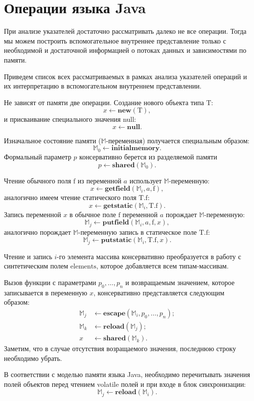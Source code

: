 \documentclass[14pt,titlepage,draft]{extarticle}
\newcommand{\M}{\ensuremath{\mathbb{M}}}
\newcommand{\Mhyp}{$\mathbb{M}$\hyp}
\newcommand{\NEW}{\textbf{new}}
\newcommand{\NULL}{\textbf{null}}
\newcommand{\INITIALMEMORY}{\textbf{initialmemory}}
\newcommand{\GETFIELD}{\textbf{getfield}}
\newcommand{\PUTFIELD}{\textbf{putfield}}
\newcommand{\GETSTATIC}{\textbf{getstatic}}
\newcommand{\PUTSTATIC}{\textbf{putstatic}}
\newcommand{\ESCAPE}{\textbf{escape}}
\newcommand{\SHARED}{\textbf{shared}}
\newcommand{\RELOAD}{\textbf{reload}}
\newcommand{\eng}[1]{{\English#1}}
\let\oldsection\section
\renewcommand{\section}{\newpage\oldsection}
\newcommand{\sectionwithoutnumber}[1]{
  \section*{#1}
  \addcontentsline{toc}{section}{#1}
}
\newcommand{\java}{\eng{Java}\xspace}
\begin{document}
  \sectionwithoutnumber{Операции языка Java}

    При анализе указателей достаточно рассматривать далеко не все операции.
    Тогда мы можем построить вспомогательное внутреннее представление только с
    необходимой и достаточной информацией о потоках данных и зависимостями по
    памяти.

    Приведем список всех рассматриваемых в рамках анализа указателей операций и
    их интерпретацию в вспомогательном внутреннем представлении.

    Не зависят от памяти две операции. Создание нового объекта типа
    $\textrm{T}$:
    \[ x \leftarrow \NEW(\textrm{T}), \]
    и присваивание специального значения null:
    \[ x \leftarrow \NULL. \]

    Изначальное состояние памяти (\Mhyp переменная) получается специальным
    образом:
    \[ \M_0 \leftarrow \INITIALMEMORY. \]
    Формальный параметр $p$ консервативно берется из разделяемой памяти
    \[ p \leftarrow \SHARED(\M_0). \]

    Чтение обычного поля $\textrm{f}$ из переменной $a$ использует
    \Mhyp переменную:
    \[ x \leftarrow \GETFIELD(\M_i, a, \textrm{f}), \]
    аналогично имеем чтение статического поля $\textrm{T.f}$:
    \[ x \leftarrow \GETSTATIC(\M_i, \textrm{T.f}). \]
    Запись переменной $x$ в обычное поле $\textrm{f}$ переменной $a$ порождает
    \Mhyp переменную:
    \[ \M_j \leftarrow \PUTFIELD(\M_i, a, \textrm{f}, x), \]
    аналогично порождает \Mhyp переменную запись в статическое поле $\textrm{T.f}$:
    \[ \M_j \leftarrow \PUTSTATIC(\M_i, \textrm{T.f}, x). \]

    Чтение и запись $i$-го элемента массива консервативно преобразуется в
    работу с синтетическим полем $\textrm{elements}$, которое добавляется всем
    типам-массивам.

    Вызов функции с параметрами $p_0, \ldots, p_n$ и возвращаемым значением,
    которое записывается в переменную $x$, консервативно представляется
    следующим образом:
    \[\begin{aligned}
      \M_j &\leftarrow \ESCAPE(\M_i, p_0, \ldots, p_n); \\
      \M_k &\leftarrow \RELOAD(\M_j); \\
      x  &\leftarrow \SHARED(\M_k).
    \end{aligned}\]
    Заметим, что в случае отсутствия возращаемого значения, последнюю строку
    необходимо убрать.

    В соответствии с моделью памяти языка \java, необходимо перечитывать
    значения полей объектов перед чтением \eng{volatile} полей и при входе в
    блок синхронизации:
    \[ \M_j \leftarrow \RELOAD(\M_i). \]

  \newpage
  
\end{document}
